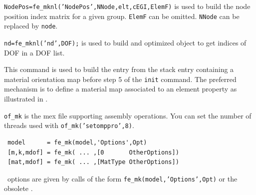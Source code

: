 
{\tt NodePos=fe\_mknl('NodePos',NNode,elt,cEGI,ElemF)} is used to build the node position index matrix for a given group. {\tt ElemF} can be omitted. {\tt NNode} can be replaced by {\tt node}. 


{\tt nd=fe\_mknl('nd',DOF);} is used to build and optimized object to get indices of DOF in a DOF list.


This command is used to build the  entry from the stack entry  containing a material orientation map before step 5 of the {\tt init} command. The preferred mechanism is to define a material map associated to an element property as illustrated in . 



{\tt of\_mk} is the mex file supporting assembly operations. You can set the number of threads used with {\tt  of\_mk('setomppro',8)}.



\rsyntax\begin{verbatim}
 model      = fe_mk(model,'Options',Opt)
 [m,k,mdof] = fe_mk( ... ,[0       OtherOptions])
 [mat,mdof] = fe_mk( ... ,[MatType OtherOptions])
\end{verbatim}


\femk\ options are given by calls of the form {\tt fe\_mk(model,'Options',Opt)} or the obsolete .


